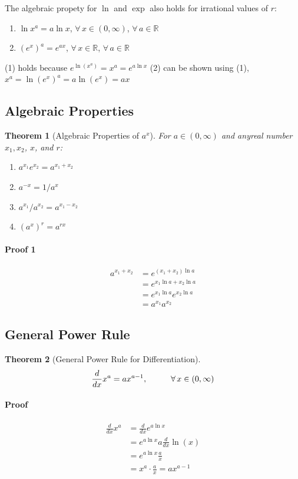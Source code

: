 \documentclass[12pt]{article}
\newcommand\tab[1][1cm]{\hspace*{#1}}
\newtheorem{theorem}{Theorem}
\begin{document}
The algebraic propety for $\ln$ and $\exp$ also holds for irrational values of $r$:
\begin{enumerate}
    \item $\ln {x^a} = a \ln x$, $\forall \, x \in (0, \infty)$, $\forall \, a \in \mathbb{R}$
    \item $(e^x)^a = e^{ax}$, $\forall \, x \in \mathbb{R}$, $\forall \, a \in \mathbb{R}$
\end{enumerate}
(1) holds because $e^{\ln (x^a)} = x^a = e^{a \ln x}$
(2) can be shown using (1), $x^a = \ln(e^{x})^a = a \ln(e^x) = ax$

\subsection{Algebraic Properties}
\begin{theorem}[Algebraic Properties of $a^x$]
    For $a \in (0, \infty)$ and anyreal number $x_1, x_2$, $x$, and $r$:
    \begin{enumerate} 
         \item $a^{x_1}e^{x_2} = a^{x_1 + x_2}$
         \item $a^{-x} = 1/a^x$
         \item $a^{x_1}/a^{x_2} = a^{x_1 - x_2}$
         \item $(a^x)^r = a^{rx}$
    \end{enumerate}
\end{theorem}

\paragraph{Proof 1} 
\begin{align*} 
     a^{x_1 + x_2} &= e^{(x_1 + x_2)\ln a} \\
     &= e^{x_1 \ln a + x_2 \ln a} \\
     &= e^{x_1\ln a}e^{x_2\ln a} \\
     &= a^{x_1}a^{x_2}
\end{align*}

\subsection{General Power Rule}
\begin{theorem}[General Power Rule for Differentiation]
    \[
        \frac{d}{dx} x^a = ax^{a - 1}, \textrm{\tab} \forall \, x \in (0, \infty)
    \]
\end{theorem}

\paragraph{Proof}
\begin{align*} 
    \frac{d}{dx} x^a &= \frac{d}{dx} e^{a \ln x} \\
    &= e^{a \ln x} a \frac{d}{dx} \ln (x) \\
    &= e^{a \ln x} \frac{a}{x} \\
    &= x^a\cdot \frac{a}{x} = ax^{a - 1}
\end{align*}
\end{document}
